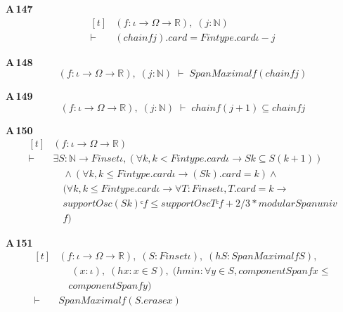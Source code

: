\noindent\textbf{A\,147}\quad{}
{\footnotesize\[ \begin{aligned}[t]
&(\mathit{f} : \iota \to \Omega \to \mathbb{R} ),\; (\mathit{j} : \mathbb{N} )\\
\vdash\;&(\mathit{chain} \mathit{f} \mathit{j}).\mathit{card} = \mathit{Fintype}.\mathit{card} \iota - \mathit{j}
\end{aligned} \]}

\noindent\textbf{A\,148}\quad{}
{\footnotesize\[ (\mathit{f} : \iota \to \Omega \to \mathbb{R} ),\; (\mathit{j} : \mathbb{N} ) \;\vdash\; \mathit{SpanMaximal} \mathit{f} (\mathit{chain} \mathit{f} \mathit{j}) \]}

\noindent\textbf{A\,149}\quad{}
{\footnotesize\[ (\mathit{f} : \iota \to \Omega \to \mathbb{R} ),\; (\mathit{j} : \mathbb{N} ) \;\vdash\; \mathit{chain} \mathit{f} (\mathit{j}+1) \subseteq \mathit{chain} \mathit{f} \mathit{j} \]}

\noindent\textbf{A\,150}\quad{}
{\footnotesize\[ \begin{aligned}[t]
&(\mathit{f} : \iota \to \Omega \to \mathbb{R} )\\
\vdash\;&\exists \mathit{S} : \mathbb{N} \to \mathit{Finset} \iota , (\forall \mathit{k}, \mathit{k} < \mathit{Fintype}.\mathit{card} \iota \to \mathit{S} \mathit{k} \subseteq \mathit{S} (\mathit{k}+1))\\
&\quad \wedge (\forall \mathit{k}, \mathit{k} \leq \mathit{Fintype}.\mathit{card} \iota \to (\mathit{S} \mathit{k}).\mathit{card} = \mathit{k}) \wedge\\
&\quad (\forall \mathit{k}, \mathit{k} \leq \mathit{Fintype}.\mathit{card} \iota \to \forall \mathit{T} : \mathit{Finset} \iota , \mathit{T}.\mathit{card} = \mathit{k} \to\\
&\quad \mathit{supportOsc} (\mathit{S} \mathit{k})ᶜ \mathit{f} \leq \mathit{supportOsc} \mathit{Tᶜ} \mathit{f} + 2/3 * \mathit{modularSpan} \mathit{univ}\\
&\quad \mathit{f})
\end{aligned} \]}

\noindent\textbf{A\,151}\quad{}
{\footnotesize\[ \begin{aligned}[t]
&(\mathit{f} : \iota \to \Omega \to \mathbb{R} ),\; (\mathit{S} : \mathit{Finset} \iota ),\; (\mathit{hS} : \mathit{SpanMaximal} \mathit{f} \mathit{S}),\\
&\quad \; (\mathit{x} : \iota ),\; (\mathit{hx} : \mathit{x} \in \mathit{S}),\; (\mathit{hmin} : \forall \mathit{y} \in \mathit{S}, \mathit{componentSpan} \mathit{f} \mathit{x} \leq\\
&\quad \mathit{componentSpan} \mathit{f} \mathit{y})\\
\vdash\;&\mathit{SpanMaximal} \mathit{f} (\mathit{S}.\mathit{erase} \mathit{x})
\end{aligned} \]}

